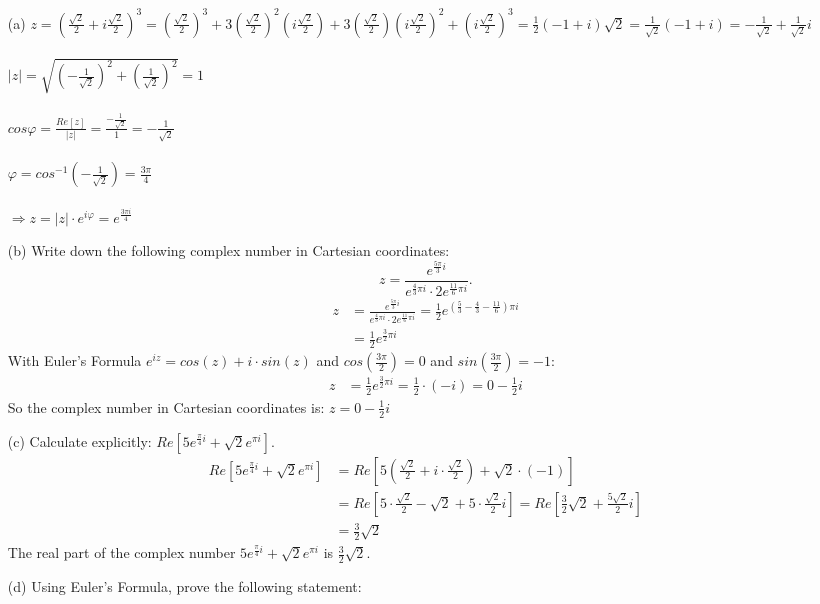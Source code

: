 \documentclass[12pt]{article}
\begin{document}
\begin{itemize}
    \item[(a)]
    $z = (\frac{\sqrt{2}}{2}+i\frac{\sqrt{2}}{2})^{3} = (\frac{\sqrt{2}}{2})^{3} + 3(\frac{\sqrt{2}}{2})^{2}(i\frac{\sqrt{2}}{2}) + 3(\frac{\sqrt{2}}{2})(i\frac{\sqrt{2}}{2})^{2} + (i\frac{\sqrt{2}}{2})^{3} = \frac{1}{2}(-1+i)\sqrt{2}=\frac{1}{\sqrt{2}}(-1+i)=-\frac{1}{\sqrt{2}}+\frac{1}{\sqrt{2}}i$\\\\
    $|z|=\sqrt{(-\frac{1}{\sqrt{2}})^{2}+(\frac{1}{\sqrt{2}})^{2}}=1$\\\\
    $cos\varphi=\frac{Re[z]}{|z|}=\frac{-\frac{1}{\sqrt{2}}}{1}=-\frac{1}{\sqrt{2}}$\\\\
    $\varphi=cos^{-1}(-\frac{1}{\sqrt{2}})=\frac{3\pi}{4}$\\\\
    $\Rightarrow z=|z|\cdot e^{i\varphi}=e^{\frac{3\pi i}{4}}$

    \item[(b)]
    Write down the following complex number in Cartesian coordinates:
   $$z = \frac{e^{\frac{5\pi}{3}i}}{e^{\frac{4}{3}\pi i} \cdot 2 e^{\frac{11}{6}\pi i}}.$$
\begin{align*}
   z &= \frac{e^{\frac{5\pi}{3}i}}{e^{\frac{4}{3}\pi i} \cdot 2 e^{\frac{11}{6}\pi i}} = \frac{1}{2} e^{\left(\frac{5}{3} - \frac{4}{3} - \frac{11}{6}\right)\pi i} \\
   &= \frac{1}{2} e^{\frac{3}{2}\pi i}
\end{align*}
With Euler's Formula $e^{iz} = cos(z) + i \cdot sin(z)$ and $cos\left(\frac{3 \pi}{2}\right) = 0$ and $sin\left(\frac{3 \pi}{2}\right) = -1$:
\begin{align*}
   z &= \frac{1}{2} e^{\frac{3}{2}\pi i} = \frac{1}{2} \cdot (-i) = 0 - \frac{1}{2} i
\end{align*}
So the complex number in Cartesian coordinates is: $z =0 - \frac{1}{2} i$
\newpage
    \item[(c)]
    Calculate explicitly:
    $Re[5e^{\frac{\pi}{4}i}+\sqrt{2}e^{\pi i}]$.
    \begin{align*}
        Re\left[5e^{\frac{\pi}{4}i}+\sqrt{2}e^{\pi i}\right] &= Re\left[5\left(\frac{\sqrt{2}}{2} + i \cdot \frac{\sqrt{2}}{2} \right)+\sqrt{2}\cdot (-1)\right] \\
        &= Re \left[5 \cdot \frac{\sqrt{2}}{2} - \sqrt{2} + 5 \cdot \frac{\sqrt{2}}{2}i \right] = Re \left[\frac{3}{2} \sqrt{2} + \frac{5 \sqrt{2}}{2} i \right] \\
        &= \frac{3}{2} \sqrt{2}
    \end{align*}
    The real part of the complex number $5e^{\frac{\pi}{4}i}+\sqrt{2}e^{\pi i}$ is $\frac{3}{2} \sqrt{2}$.
    \item[(d)]
    Using Euler's Formula, prove the following statement:


\end{itemize}
\end{document}
